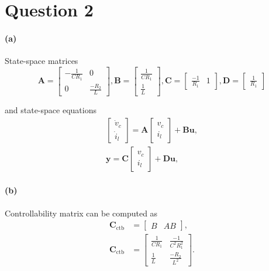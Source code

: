 \section{Question 2}
\paragraph{(a)} State-space matrices
\begin{equation*}
\mathbf{A} =
\begin{bmatrix}
	-\frac{1}{C R_1} & 0 \\ 0 & \frac{-R_2}{L}
\end{bmatrix},
\mathbf{B} =
\begin{bmatrix}
	\frac{1}{C R_1} \\ \frac{1}{L}
\end{bmatrix},
\mathbf{C} =
\begin{bmatrix}
	\frac{-1}{R_1} & 1
\end{bmatrix},
\mathbf{D} =
\begin{bmatrix}
\frac{1}{R_1}
\end{bmatrix}
\end{equation*}

and state-space equations
\begin{align*}
	\begin{bmatrix}
	\dot{v}_c \\ \dot{i}_l
	\end{bmatrix}
	=
	\mathbf{A}
	\begin{bmatrix}
	v_c \\ i_l
	\end{bmatrix}
	 + \mathbf{B}\mathbf{u}, \\
	\mathbf{y} = \mathbf{C}
		\begin{bmatrix}
		v_c \\ i_l
		\end{bmatrix}
	+ \mathbf{D}\mathbf{u},
\end{align*}

\paragraph{(b)} Controllability matrix can be computed as
\begin{align*}
\mathbf{C_{\mathrm{ctb}}} &= 
\begin{bmatrix}
B & AB
\end{bmatrix},
\\
\mathbf{C_{\mathrm{ctb}}} &= 
\begin{bmatrix}
	\frac{1}{C R_1} & \frac{-1}{C^2 R^2_1} \\ \frac{1}{L} & \frac{-R_2}{L^2}
\end{bmatrix}.
\end{align*}


